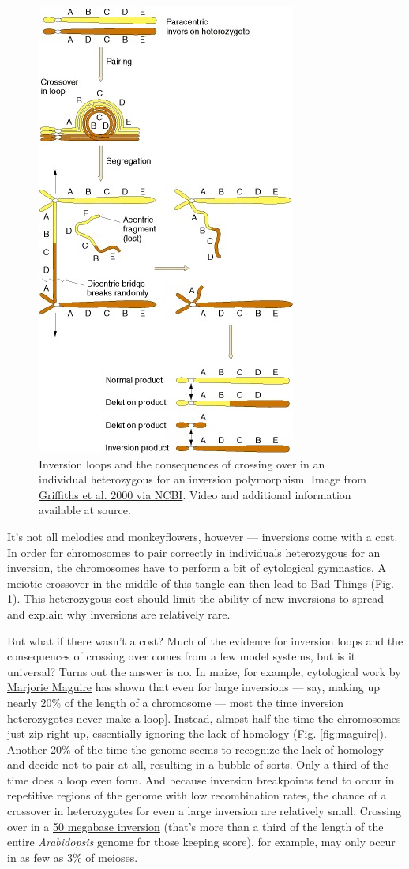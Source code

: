 \documentclass[]{article}
\begin{document}
\begin{figure}   
   \includegraphics[width=0.3\linewidth]{ch17f16.png}
   \caption{ Inversion loops and the consequences of crossing over in an individual heterozygous for an inversion polymorphism. Image from \href{http://www.ncbi.nlm.nih.gov/books/NBK22042//}{Griffiths et al. 2000 via NCBI}. Video and additional information available at source.} 
    \label{fig:loop}
\end{figure}

It's not all melodies and monkeyflowers, however --- inversions come with a cost.  
In order for chromosomes to pair correctly in individuals heterozygous for an inversion, the chromosomes have to perform a bit of cytological gymnastics.  
A meiotic crossover in the middle of this tangle can then lead to Bad Things (Fig. \ref{fig:loop}).  
This heterozygous cost should limit the ability of new inversions to spread and explain why inversions are relatively rare. 

But what if there wasn't a cost? 
Much of the evidence for inversion loops and the consequences of crossing over comes from a few model systems, but is it universal? 
Turns out the answer is no.  
In maize, for example, cytological work by \href{http://www.ncbi.nlm.nih.gov/pmc/articles/PMC1211081/}{Marjorie Maguire} has shown that even for large inversions --- say, making up nearly 20\% of the length of a chromosome --- most the time inversion heterozygotes never make a loop].  
Instead, almost half the time the chromosomes just zip right up, essentially ignoring the lack of homology (Fig. \ref{fig:maguire}).  
Another 20\% of the time the genome seems to recognize the lack of homology and decide not to pair at all, resulting in a bubble of sorts.  
Only a third of the time does a loop even form. 
And because inversion breakpoints tend to occur in repetitive regions of the genome with low recombination rates, the chance of a crossover in heterozygotes for even a large inversion are relatively small. 
Crossing over in a \href{http://www.genetics.org/content/191/3/883.short}{50 megabase inversion} (that's more than a third of the length of the entire \textit{Arabidopsis} genome for those keeping score), for example, may only occur in as few as 3\% of meioses.
\end{document}
